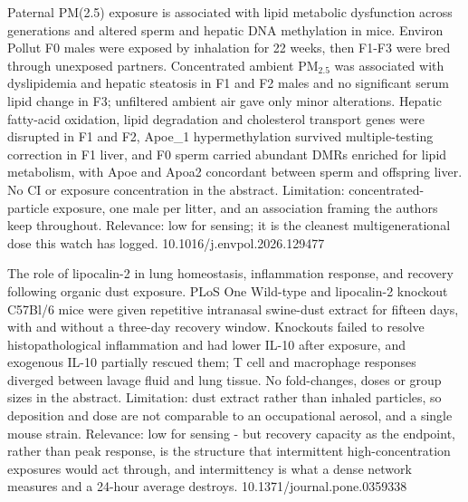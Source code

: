 \documentclass[10pt]{article}
\begin{document}
{Paternal PM(2.5) exposure is associated with lipid metabolic dysfunction across generations and altered sperm and hepatic DNA methylation in mice.}
{Environ Pollut}
{F0 males were exposed by inhalation for 22 weeks, then F1-F3 were bred through unexposed partners. Concentrated ambient PM$_{2.5}$ was associated with dyslipidemia and hepatic steatosis in F1 and F2 males and no significant serum lipid change in F3; unfiltered ambient air gave only minor alterations. Hepatic fatty-acid oxidation, lipid degradation and cholesterol transport genes were disrupted in F1 and F2, Apoe\_1 hypermethylation survived multiple-testing correction in F1 liver, and F0 sperm carried abundant DMRs enriched for lipid metabolism, with Apoe and Apoa2 concordant between sperm and offspring liver. No CI or exposure concentration in the abstract. Limitation: concentrated-particle exposure, one male per litter, and an association framing the authors keep throughout. Relevance: low for sensing; it is the cleanest multigenerational dose this watch has logged.}
{10.1016/j.envpol.2026.129477}

\par{}\baselineskip{}\baselineskip
{}

{The role of lipocalin-2 in lung homeostasis, inflammation response, and recovery following organic dust exposure.}
{PLoS One}
{Wild-type and lipocalin-2 knockout C57Bl/6 mice were given repetitive intranasal swine-dust extract for fifteen days, with and without a three-day recovery window. Knockouts failed to resolve histopathological inflammation and had lower IL-10 after exposure, and exogenous IL-10 partially rescued them; T cell and macrophage responses diverged between lavage fluid and lung tissue. No fold-changes, doses or group sizes in the abstract. Limitation: dust extract rather than inhaled particles, so deposition and dose are not comparable to an occupational aerosol, and a single mouse strain. Relevance: low for sensing - but recovery capacity as the endpoint, rather than peak response, is the structure that intermittent high-concentration exposures would act through, and intermittency is what a dense network measures and a 24-hour average destroys.}
{10.1371/journal.pone.0359338}
\end{document}
